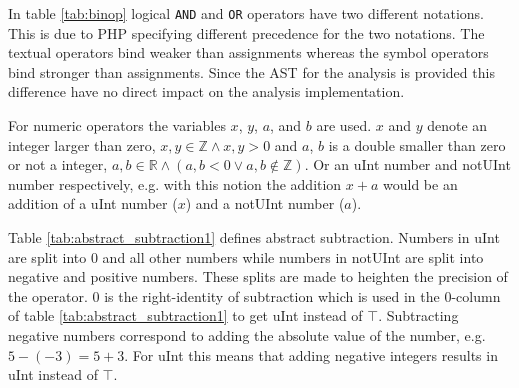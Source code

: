 In table \ref{tab:binop} logical \texttt{AND} and \texttt{OR} operators have two different notations. This is due to PHP specifying different precedence for the two notations. The textual operators bind weaker than assignments whereas the symbol operators bind stronger than assignments. Since the AST for the analysis is provided this difference have no direct impact on the analysis implementation.

For numeric operators the variables $x$, $y$, $a$, and $b$ are used. $x$ and $y$ denote an integer larger than zero, $x, y \in \mathbb{Z} \wedge x, y > 0$ and $a$, $b$ is a double smaller than zero or not a integer, $a, b \in \mathbb{R} \wedge (a, b < 0 \vee a, b \notin \mathbb{Z})$. Or an uInt number and notUInt number respectively, e.g. with this notion the addition $x+a$ would be an addition of a uInt number ($x$) and a notUInt number ($a$).


Table \ref{tab:abstract_subtraction1} defines abstract subtraction. Numbers in uInt are split into 0 and all other numbers while numbers in notUInt are split into negative and positive numbers. These splits are made to heighten the precision of the operator. 0 is the right-identity of subtraction which is used in the 0-column of table \ref{tab:abstract_subtraction1} to get uInt instead of $\top$. Subtracting negative numbers correspond to adding the absolute value of the number, e.g. $5 - (-3) = 5 + 3$. For uInt this means that adding negative integers results in uInt instead of $\top$.

